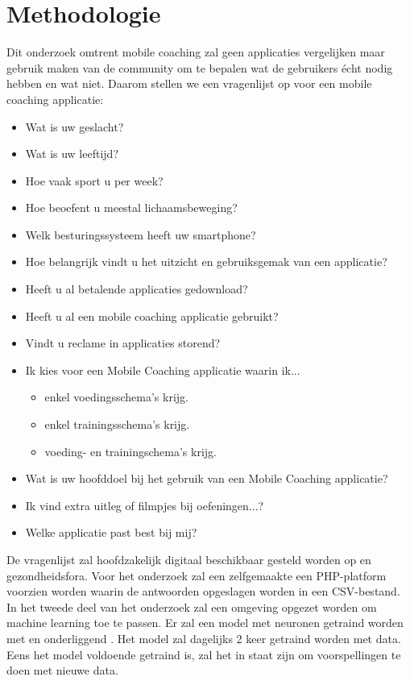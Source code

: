 \section{Methodologie}
\label{sec:methodologie}

Dit onderzoek omtrent mobile coaching zal geen applicaties vergelijken maar gebruik maken van de community om te bepalen wat de gebruikers écht nodig hebben en wat niet. Daarom stellen we een vragenlijst op voor een mobile coaching applicatie: 
\begin{itemize}
\item Wat is uw geslacht?
\item Wat is uw leeftijd?
\item Hoe vaak sport u per week?
\item Hoe beoefent u meestal lichaamsbeweging?
\item Welk besturingssysteem heeft uw smartphone?
\item Hoe belangrijk vindt u het uitzicht en gebruiksgemak van een applicatie?
\item Heeft u al betalende applicaties gedownload?
\item Heeft u al een mobile coaching applicatie gebruikt?
\item Vindt u reclame in applicaties storend?
\item Ik kies voor een Mobile Coaching applicatie waarin ik...  
\begin{itemize}
\item enkel voedingsschema's krijg.
\item enkel trainingsschema's krijg.
\item voeding- en trainingschema's krijg.
\end{itemize}
\item Wat is uw hoofddoel bij het gebruik van een Mobile Coaching applicatie?
\item Ik vind extra uitleg of filmpjes bij oefeningen...?
\item Welke applicatie past best bij mij?\hfill \break \break 
\end{itemize}
 De vragenlijst zal hoofdzakelijk digitaal beschikbaar gesteld worden op \textcite{Facebook} en gezondheidsfora.  Voor het onderzoek zal een zelfgemaakte een PHP-platform voorzien worden waarin de antwoorden opgeslagen worden in een CSV-bestand. \hfill \break \break 
 In het tweede deel van het onderzoek zal een \textcite{Python} omgeving opgezet worden om machine learning toe te passen. Er zal een model met neuronen getraind worden met \textcite{Keras} en onderliggend \textcite{TensorFlow}. Het model zal dagelijks 2 keer getraind worden met data. Eens het model voldoende getraind is, zal het in staat zijn om voorspellingen te doen met nieuwe data.

